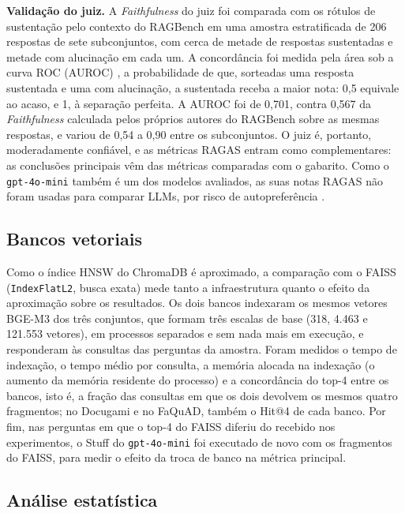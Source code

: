 \textbf{Validação do juiz.} A \emph{Faithfulness} do juiz foi comparada com os rótulos de sustentação pelo contexto do RAGBench \cite{friel2024ragbench} em uma amostra estratificada de 206 respostas de sete subconjuntos, com cerca de metade de respostas sustentadas e metade com alucinação em cada um. A concordância foi medida pela área sob a curva ROC (AUROC) \cite{hanley1982roc}, a probabilidade de que, sorteadas uma resposta sustentada e uma com alucinação, a sustentada receba a maior nota: 0,5 equivale ao acaso, e 1, à separação perfeita. A AUROC foi de 0,701, contra 0,567 da \emph{Faithfulness} calculada pelos próprios autores do RAGBench sobre as mesmas respostas, e variou de 0,54 a 0,90 entre os subconjuntos. O juiz é, portanto, moderadamente confiável, e as métricas RAGAS entram como complementares: as conclusões principais vêm das métricas comparadas com o gabarito. Como o \texttt{gpt-4o-mini} também é um dos modelos avaliados, as suas notas RAGAS não foram usadas para comparar LLMs, por risco de autopreferência \cite{panickssery2024selfpref}.

\subsection{Bancos vetoriais}

Como o índice HNSW do ChromaDB é aproximado, a comparação com o FAISS (\texttt{IndexFlatL2}, busca exata) mede tanto a infraestrutura quanto o efeito da aproximação sobre os resultados. Os dois bancos indexaram os mesmos vetores BGE-M3 dos três conjuntos, que formam três escalas de base (318, 4.463 e 121.553 vetores), em processos separados e sem nada mais em execução, e responderam às consultas das perguntas da amostra. Foram medidos o tempo de indexação, o tempo médio por consulta, a memória alocada na indexação (o aumento da memória residente do processo) e a concordância do top-4 entre os bancos, isto é, a fração das consultas em que os dois devolvem os mesmos quatro fragmentos; no Docugami e no FaQuAD, também o Hit@4 de cada banco. Por fim, nas perguntas em que o top-4 do FAISS diferiu do recebido nos experimentos, o Stuff do \texttt{gpt-4o-mini} foi executado de novo com os fragmentos do FAISS, para medir o efeito da troca de banco na métrica principal.

\subsection{Análise estatística}

